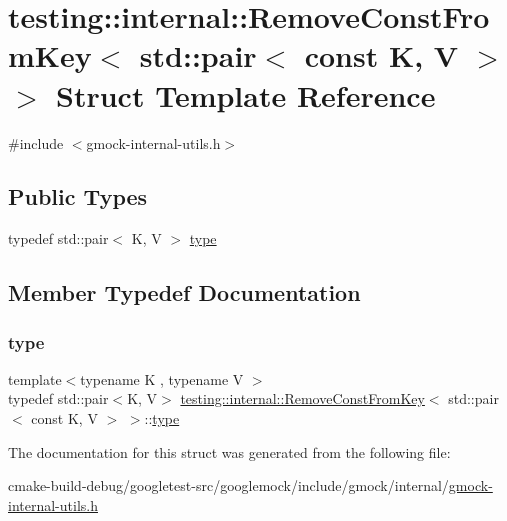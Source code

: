 \hypertarget{structtesting_1_1internal_1_1RemoveConstFromKey_3_01std_1_1pair_3_01const_01K_00_01V_01_4_01_4}{}\section{testing\+::internal\+::Remove\+Const\+From\+Key$<$ std\+::pair$<$ const K, V $>$ $>$ Struct Template Reference}
\label{structtesting_1_1internal_1_1RemoveConstFromKey_3_01std_1_1pair_3_01const_01K_00_01V_01_4_01_4}


{\ttfamily \#include $<$gmock-\/internal-\/utils.\+h$>$}

\subsection*{Public Types}
\begin{DoxyCompactItemize}
\item 
typedef std\+::pair$<$ K, V $>$ \mbox{\hyperlink{structtesting_1_1internal_1_1RemoveConstFromKey_3_01std_1_1pair_3_01const_01K_00_01V_01_4_01_4_ac1d76274964aa8172889a4714246e86f}{type}}
\end{DoxyCompactItemize}


\subsection{Member Typedef Documentation}
\mbox{\label{structtesting_1_1internal_1_1RemoveConstFromKey_3_01std_1_1pair_3_01const_01K_00_01V_01_4_01_4_ac1d76274964aa8172889a4714246e86f}} 
\subsubsection{\texorpdfstring{type}{type}}
{\footnotesize\ttfamily template$<$typename K , typename V $>$ \\
typedef std\+::pair$<$K, V$>$ \mbox{\hyperlink{structtesting_1_1internal_1_1RemoveConstFromKey}{testing\+::internal\+::\+Remove\+Const\+From\+Key}}$<$ std\+::pair$<$ const K, V $>$ $>$\+::\mbox{\hyperlink{structtesting_1_1internal_1_1RemoveConstFromKey_3_01std_1_1pair_3_01const_01K_00_01V_01_4_01_4_ac1d76274964aa8172889a4714246e86f}{type}}}



The documentation for this struct was generated from the following file\+:\begin{DoxyCompactItemize}
\item 
cmake-\/build-\/debug/googletest-\/src/googlemock/include/gmock/internal/\mbox{\hyperlink{gmock-internal-utils_8h}{gmock-\/internal-\/utils.\+h}}\end{DoxyCompactItemize}
